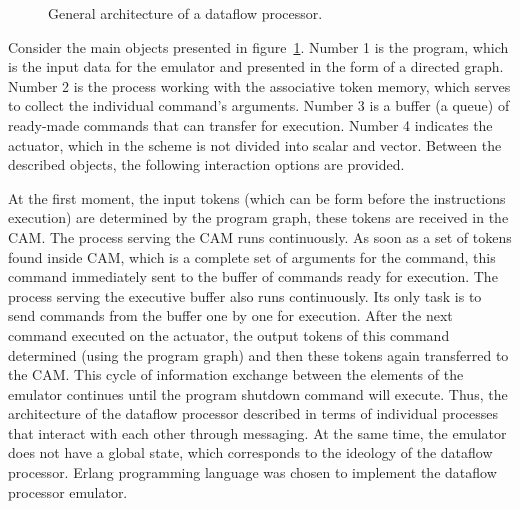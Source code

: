 \documentclass[
11pt,%
tightenlines,%
twoside,%
onecolumn,%
nofloats,%
nobibnotes,%
nofootinbib,%
superscriptaddress,%
noshowpacs,%
centertags]%
{revtex4}
\begin{document}
\begin{figure}[h!]
\setcaptionmargin{5mm}
\onelinecaptionsfalse
{}
\caption{General architecture of a dataflow processor.}
\label{fig:big-scheme}
\end{figure}


Consider the main objects presented in figure~\ref{fig:big-scheme}. Number 1 is the program, which is the input data for the emulator and presented in the form of a directed graph. Number 2 is the process working with the associative token memory, which serves to collect the individual command's arguments. Number 3 is a buffer (a queue) of ready-made commands that can transfer for execution. Number 4 indicates the actuator, which in the scheme is not divided into scalar and vector. Between the described objects, the following interaction options are provided.

At the first moment, the input tokens (which can be form before the instructions execution) are determined by the program graph, these tokens are received in the CAM. The process serving the CAM runs continuously. As soon as a set of tokens found inside CAM, which is a complete set of arguments for the command, this command immediately sent to the buffer of commands ready for execution. The process serving the executive buffer also runs continuously. Its only task is to send commands from the buffer one by one for execution. After the next command executed on the actuator, the output tokens of this command determined (using the program graph) and then these tokens again transferred to the CAM. This cycle of information exchange between the elements of the emulator continues until the program shutdown command will execute. Thus, the architecture of the dataflow processor described in terms of individual processes that interact with each other through messaging. At the same time, the emulator does not have a global state, which corresponds to the ideology of the dataflow processor. Erlang programming language \cite{Armstrong,Cesarini} was chosen to implement the dataflow processor emulator.
\end{document}
